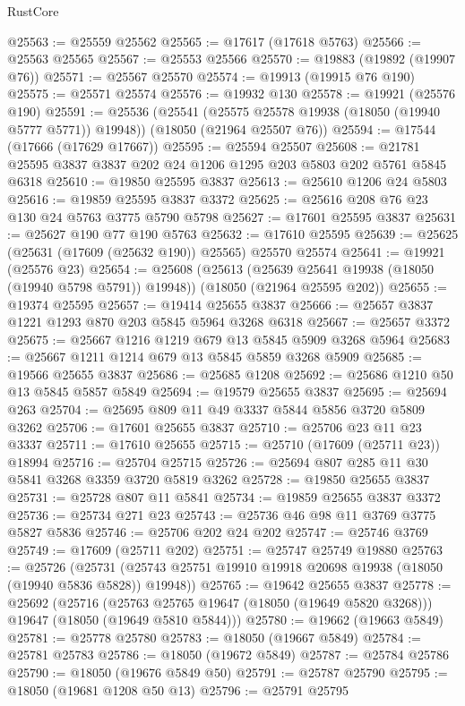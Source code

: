 \begin{lexlean}{RustCore}
\begin{coremodule}
@25563 := @25559 @25562
@25565 := @17617 (@17618 @5763)
@25566 := @25563 @25565
@25567 := @25553 @25566
@25570 := @19883 (@19892 (@19907 @76))
@25571 := @25567 @25570
@25574 := @19913 (@19915 @76 @190)
@25575 := @25571 @25574
@25576 := @19932 @130
@25578 := @19921 (@25576 @190)
@25591 := @25536
    (@25541 (@25575 @25578 @19938 (@18050 (@19940 @5777 @5771)) @19948))
    (@18050 (@21964 @25507 @76))
@25594 := @17544 (@17666 (@17629 @17667))
@25595 := @25594 @25507
@25608 := @21781 @25595 @3837 @3837 @202 @24 @1206 @1295 @203 @5803 @202 @5761 @5845 @6318
@25610 := @19850 @25595 @3837
@25613 := @25610 @1206 @24 @5803
@25616 := @19859 @25595 @3837 @3372
@25625 := @25616 @208 @76 @23 @130 @24 @5763 @3775 @5790 @5798
@25627 := @17601 @25595 @3837
@25631 := @25627 @190 @77 @190 @5763
@25632 := @17610 @25595
@25639 := @25625 (@25631 (@17609 (@25632 @190)) @25565) @25570 @25574
@25641 := @19921 (@25576 @23)
@25654 := @25608
    (@25613 (@25639 @25641 @19938 (@18050 (@19940 @5798 @5791)) @19948))
    (@18050 (@21964 @25595 @202))
@25655 := @19374 @25595
@25657 := @19414 @25655 @3837
@25666 := @25657 @3837 @1221 @1293 @870 @203 @5845 @5964 @3268 @6318
@25667 := @25657 @3372
@25675 := @25667 @1216 @1219 @679 @13 @5845 @5909 @3268 @5964
@25683 := @25667 @1211 @1214 @679 @13 @5845 @5859 @3268 @5909
@25685 := @19566 @25655 @3837
@25686 := @25685 @1208
@25692 := @25686 @1210 @50 @13 @5845 @5857 @5849
@25694 := @19579 @25655 @3837
@25695 := @25694 @263
@25704 := @25695 @809 @11 @49 @3337 @5844 @5856 @3720 @5809 @3262
@25706 := @17601 @25655 @3837
@25710 := @25706 @23 @11 @23 @3337
@25711 := @17610 @25655
@25715 := @25710 (@17609 (@25711 @23)) @18994
@25716 := @25704 @25715
@25726 := @25694 @807 @285 @11 @30 @5841 @3268 @3359 @3720 @5819 @3262
@25728 := @19850 @25655 @3837
@25731 := @25728 @807 @11 @5841
@25734 := @19859 @25655 @3837 @3372
@25736 := @25734 @271 @23
@25743 := @25736 @46 @98 @11 @3769 @3775 @5827 @5836
@25746 := @25706 @202 @24 @202
@25747 := @25746 @3769
@25749 := @17609 (@25711 @202)
@25751 := @25747 @25749 @19880
@25763 := @25726
    (@25731 (@25743 @25751 @19910 @19918 @20698 @19938 (@18050 (@19940 @5836 @5828)) @19948))
@25765 := @19642 @25655 @3837
@25778 := @25692
    (@25716
      (@25763 @25765 @19647 (@18050 (@19649 @5820 @3268)))
      @19647
      (@18050 (@19649 @5810 @5844)))
@25780 := @19662 (@19663 @5849)
@25781 := @25778 @25780
@25783 := @18050 (@19667 @5849)
@25784 := @25781 @25783
@25786 := @18050 (@19672 @5849)
@25787 := @25784 @25786
@25790 := @18050 (@19676 @5849 @50)
@25791 := @25787 @25790
@25795 := @18050 (@19681 @1208 @50 @13)
@25796 := @25791 @25795

\end{coremodule}
\end{lexlean}
